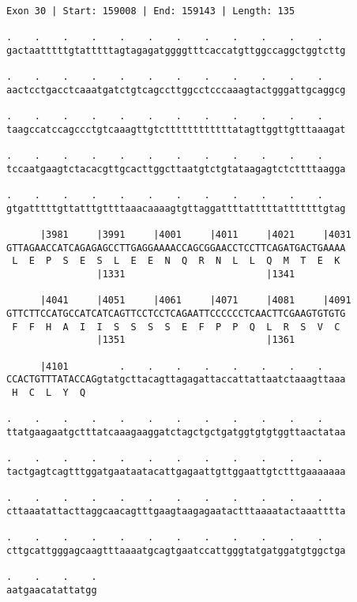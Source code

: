 \documentclass{article}
\begin{document}
\begin{Verbatim}[fontfamily=courier]
Exon 30 | Start: 159008 | End: 159143 | Length: 135

.    .    .    .    .    .    .    .    .    .    .    .    
gactaatttttgtatttttagtagagatggggtttcaccatgttggccaggctggtcttg

.    .    .    .    .    .    .    .    .    .    .    .    
aactcctgacctcaaatgatctgtcagccttggcctcccaaagtactgggattgcaggcg

.    .    .    .    .    .    .    .    .    .    .    .    
taagccatccagccctgtcaaagttgtcttttttttttttatagttggttgtttaaagat

.    .    .    .    .    .    .    .    .    .    .    .    
tccaatgaagtctacacgttgcacttggcttaatgtctgtataagagtctcttttaagga

.    .    .    .    .    .    .    .    .    .    .    .    
gtgatttttgttatttgttttaaacaaaagtgttaggattttatttttatttttttgtag

      |3981     |3991     |4001     |4011     |4021     |4031
GTTAGAACCATCAGAGAGCCTTGAGGAAAACCAGCGGAACCTCCTTCAGATGACTGAAAA
 L  E  P  S  E  S  L  E  E  N  Q  R  N  L  L  Q  M  T  E  K 
                |1331                         |1341         

      |4041     |4051     |4061     |4071     |4081     |4091
GTTCTTCCATGCCATCATCAGTTCCTCCTCAGAATTCCCCCCTCAACTTCGAAGTGTGTG
 F  F  H  A  I  I  S  S  S  S  E  F  P  P  Q  L  R  S  V  C 
                |1351                         |1361         

      |4101         .    .    .    .    .    .    .    .    
CCACTGTTTATACCAGgtatgcttacagttagagattaccattattaatctaaagttaaa
 H  C  L  Y  Q                                              

.    .    .    .    .    .    .    .    .    .    .    .    
ttatgaagaatgctttatcaaagaaggatctagctgctgatggtgtgtggttaactataa

.    .    .    .    .    .    .    .    .    .    .    .    
tactgagtcagtttggatgaataatacattgagaattgttggaattgtctttgaaaaaaa

.    .    .    .    .    .    .    .    .    .    .    .    
cttaaatattacttaggcaacagtttgaagtaagagaatactttaaaatactaaatttta

.    .    .    .    .    .    .    .    .    .    .    .    
cttgcattgggagcaagtttaaaatgcagtgaatccattgggtatgatggatgtggctga

.    .    .    .
aatgaacatattatgg
\end{Verbatim}
\newpage
\end{document}
